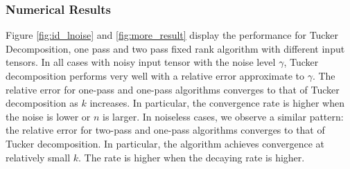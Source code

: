 \subsubsection{Numerical Results} 
Figure \ref{fig:id_lnoise} and \ref{fig:more_result} display the performance for Tucker Decomposition, one pass and two pass fixed rank algorithm with different input tensors. In all cases with noisy input tensor with the noise level $\gamma$, Tucker decomposition performs very well with a relative error approximate to $\gamma$. The relative error for one-pass and one-pass algorithms converges to that of Tucker decomposition as $k$ increases. In particular, the convergence rate is higher when the noise is lower or $n$ is larger. In noiseless cases, we observe a similar pattern: the relative error for two-pass and one-pass algorithms converges to that of Tucker decomposition. In particular, the algorithm achieves convergence at relatively small $k$. The rate is higher when the decaying rate is higher. 


